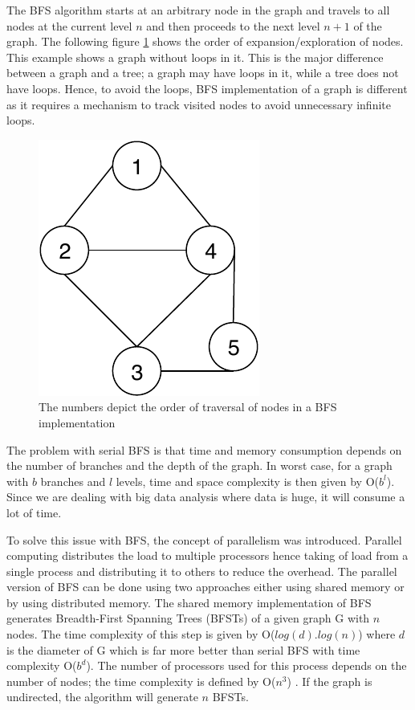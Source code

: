 \documentclass[journal,twoside,web]{ieeecolor}
\begin{document}
The BFS algorithm starts at an arbitrary node in the graph and travels to all nodes at the current level $n$ and then proceeds to the next level $n + 1$ of the graph. The following figure \ref{fig1} shows the order of expansion/exploration of nodes. This example shows a graph without loops in it. This is the major difference between a graph and a tree; a graph may have loops in it, while a tree does not have loops. Hence, to avoid the loops, BFS implementation of a graph is different as it requires a mechanism to track visited nodes to avoid unnecessary infinite loops.

\begin{figure}[!h]
    \centerline{\includegraphics[scale=1]{figures/bfs.pdf}}
    \caption{The numbers depict the order of traversal of nodes in a BFS implementation}
    \label{fig1}
\end{figure}

The problem with serial BFS is that time and memory consumption depends on the number of branches and the depth of the graph. In worst case, for a graph with ${b}$ branches and ${l}$ levels, time and space complexity is then given by O($b^l$). Since we are dealing with big data analysis where data is huge, it will consume a lot of time.

To solve this issue with BFS, the concept of parallelism was introduced. Parallel computing distributes the load to multiple processors hence taking of load from a single process and distributing it to others to reduce the overhead. The parallel version of BFS can be done using two approaches either using shared memory or by using distributed memory. The shared memory implementation of BFS generates Breadth-First Spanning Trees (BFSTs) of a given graph G with $n$ nodes. The time complexity of this step is given by O($log(d).log(n)$) where $d$ is the diameter of G which is far more better than serial BFS with time complexity O($b^d$). The number of processors used for this process depends on the number of nodes; the time complexity is defined by O($n^3$) \cite{36}. If the graph is undirected, the algorithm will generate $n$ BFSTs.
\end{document}
